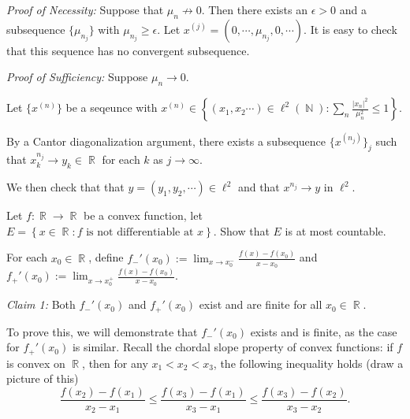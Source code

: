 \documentclass[answers]{exam}
\DeclareMathOperator{\RR}{\mathbb{R}}
\DeclareMathOperator{\NN}{\mathbb{N}}
\begin{document}
\begin{questions}
\begin{parts}
\begin{solution}
\textit{Proof of Necessity:} Suppose that $\mu_n\not\to 0$. Then there exists an $\epsilon>0$ and a subsequence $\{\mu_{n_j}\}$ with $\mu_{n_j}\geq \epsilon$.
Let $x^{(j)} = (0,\cdots,\mu_{n_j},0,\cdots)$. It is easy to check that this sequence has no convergent subsequence.

\textit{Proof of Sufficiency:} Suppose $\mu_n\to 0$. 


Let $\{x^{(n)}\}$ be a seqeunce with $x^{(n)}\in \left\{ (x_{1},x_{2}\cdots) \in \ell^{2}(\NN): \sum_{n}\frac{|x_{n}|^{2}}{\mu_{n}^{2}}\leq 1\right\}$.

By a Cantor diagonalization argument, there exists a subsequence $\{x^{(n_j)}\}_j$ such that $x^{n_j}_k\to y_k\in \RR$ for each $k$ as $j\to\infty$. 

We then check that that $y = (y_1,y_2,\cdots) \in \ell^2$ and that $x^{n_j}\to y$ in $\ell^2$.

\end{solution}
\end{parts}


\question Let $f:\RR\to\RR$ be a convex function, let $E=\left\{ x\in \RR : f \text{ is not differentiable at }x\right\}$. Show that $E$ is at most countable.


\begin{solution}
For each $x_{0}\in \RR$, define $f_{-}'(x_{0}) := \lim_{x\to x_{0}^{-}} \frac{f(x)-f(x_{0})}{x-x_{0}}$ and $f_{+}'(x_{0}) := \lim_{x\to x_{0}^{+}} \frac{f(x)-f(x_{0})}{x-x_{0}}$.

\textit{Claim 1:} Both $f_{-}'(x_{0})$ and $f_{+}'(x_{0})$ exist and are finite for all $x_{0}\in \RR$. 


To prove this, we will demonstrate that $f_{-}'(x_{0})$ exists and is finite, as the case for $f_{+}'(x_{0})$ is similar. Recall the chordal slope property of convex functions: if $f$ is convex on $\RR$, then for any $x_{1}<x_{2}<x_{3}$, the following inequality holds (draw a picture of this)
\begin{equation}\label{eq:chord-inequality}
  \frac{f(x_{2})-f(x_{1})}{x_{2}-x_{1}}\leq \frac{f(x_{3})-f(x_{1})}{x_{3}-x_{1}}\leq \frac{f(x_{3})-f(x_{2})}{x_{3}-x_{2}}.
\end{equation}


\end{solution}
\end{questions}
\end{document}
